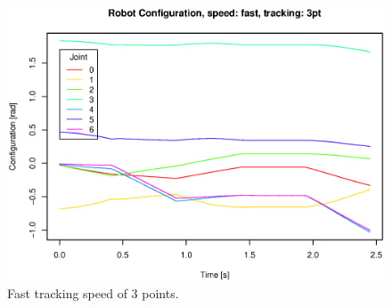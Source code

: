 \begin{figure}[H]
\centering
\includegraphics[width= \fullImageWidth]{graphics/robotics/robotConfiguration_fast_3pt}
\caption{Fast tracking speed of 3 points.}
\label{fig:robotic_conf_fast_3pt}
\end{figure}


